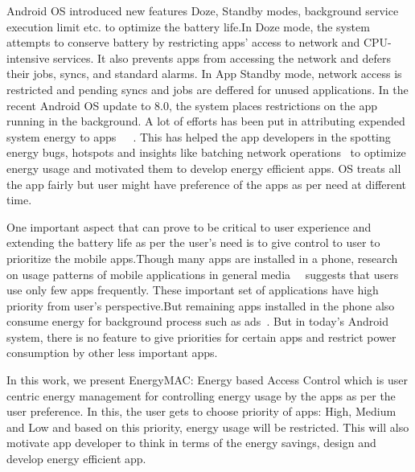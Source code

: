  
 Android OS introduced new features Doze, Standby modes, background service execution limit etc. to optimize the battery life.In Doze mode, the system attempts to conserve battery by restricting apps' access to network and CPU-intensive services. It also prevents apps from accessing the network and defers their jobs, syncs, and standard alarms. In App Standby mode, network access is restricted and pending syncs and jobs are deffered for unused applications. In the recent Android OS update to 8.0, the system places restrictions on the app running in the background. A lot of efforts has been put in attributing expended system energy to apps~\cite{pathak2012energy}~\cite{yoon2012appscope}~\cite{zhang2010accurate}. This has helped the app developers in the spotting energy bugs, hotspots\cite{banerjee2014detecting} and insights like batching network operations~\cite{pathak2012energy} to optimize energy usage and motivated them to develop energy efficient apps. OS  treats all the app fairly but user might have preference of the apps as per need at different time.
 

One important aspect that can prove to be critical to user experience and extending the battery life as per the user's need is to give control to user to prioritize the mobile apps.Though many apps are installed in a phone, research on usage patterns of mobile applications in general media~\cite{techcrunch85}~\cite{techcrunch63} suggests that users use only few apps frequently. These important set of applications have high priority from user's perspective.But remaining apps installed in the phone also consume energy for background process such as ads~\cite{stevens2012investigating}. But in today's Android system, there is no feature to give priorities for certain apps and restrict power consumption by other less important apps. 

In this work, we present EnergyMAC: Energy based Access Control which is user centric energy management for controlling energy usage by the apps as per the user preference. In this, the user gets to choose priority of apps: High, Medium and Low and based on this priority, energy usage will be restricted.  This will also motivate app developer to think in terms of the energy savings, design and develop energy efficient app.

